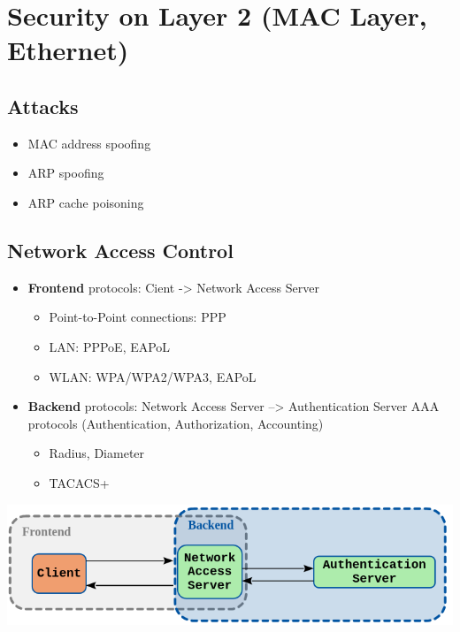 \section{Security on Layer 2 (MAC Layer, Ethernet)}
\subsection{Attacks}
\begin{itemize}
  \item MAC address spoofing
  \item ARP spoofing
  \item ARP cache poisoning
\end{itemize}

\subsection{Network Access Control}
\begin{itemize}
  \item \textbf{Frontend} protocols: Cient -> Network Access Server
    \begin{itemize}
      \item Point-to-Point connections: PPP
      \item LAN: PPPoE, EAPoL
      \item WLAN: WPA/WPA2/WPA3, EAPoL
    \end{itemize}
  \item \textbf{Backend} protocols: Network Access Server --> Authentication Server AAA protocols (Authentication, Authorization, Accounting)
    \begin{itemize}
      \item Radius, Diameter
      \item TACACS+
    \end{itemize}
\end{itemize}
\includegraphics[width=0.6\columnwidth]{Resources/network_access_control.png}

